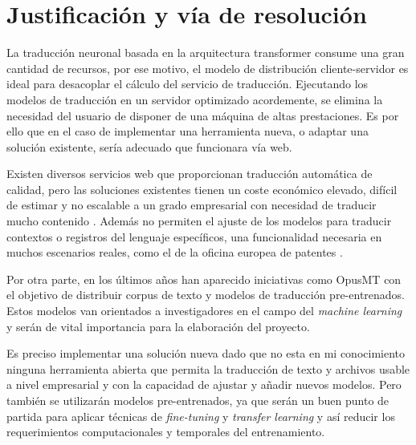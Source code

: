 \chapter{Justificación y vía de resolución}
La traducción neuronal basada en la arquitectura transformer consume una gran cantidad de recursos,
por ese motivo, el modelo de distribución cliente-servidor es ideal para desacoplar el cálculo del
servicio de traducción. Ejecutando los modelos de traducción en un servidor optimizado acordemente,
se elimina la necesidad del usuario de disponer de una máquina de altas prestaciones. Es por ello
que en el caso de implementar una herramienta nueva, o adaptar una solución existente, sería adecuado
que funcionara vía web.

Existen diversos servicios web que proporcionan traducción automática de calidad, pero las soluciones existentes tienen un coste económico elevado, difícil de estimar y no escalable a un grado empresarial con necesidad de traducir mucho contenido \cite{GoogleTranslatePricing,AWSTranslatePricing,MicrosoftTranslatePricing}.
Además no permiten el ajuste de los modelos para traducir contextos o registros del lenguaje
específicos, una funcionalidad necesaria en muchos escenarios reales, como el de la oficina europea de patentes \cite{PatentOffice2020Jul}.

Por otra parte, en los últimos años han aparecido iniciativas como OpusMT
\cite{HelsinkiTiedemannThottingal2020} con el objetivo de distribuir corpus de texto y modelos de
traducción pre-entrenados. Estos modelos van orientados a investigadores en el campo del
\textit{machine learning} y serán de vital importancia para la elaboración del proyecto.

Es preciso implementar una solución nueva dado que no esta en mi conocimiento ninguna
herramienta abierta que permita la traducción de texto y archivos usable a nivel empresarial
y con la capacidad de ajustar y añadir nuevos modelos. Pero también se utilizarán modelos
pre-entrenados, ya que serán un buen punto de partida para aplicar técnicas de
\textit{fine-tuning} y \textit{transfer learning} y así reducir los requerimientos computacionales y temporales del entrenamiento.

